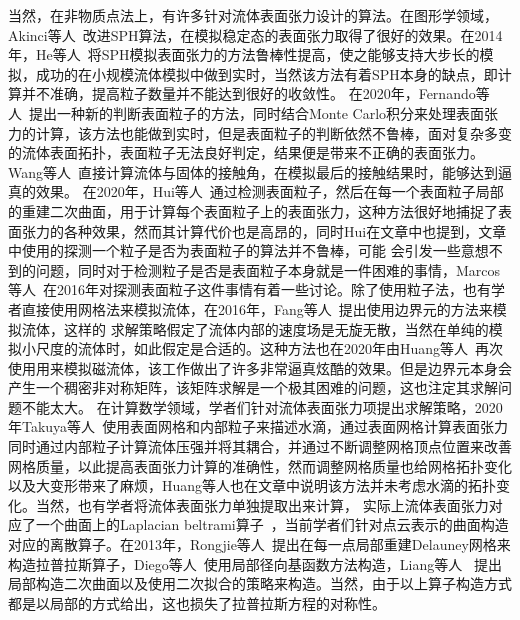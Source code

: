 当然，在非物质点法上，有许多针对流体表面张力设计的算法。在图形学领域，Akinci等人~\cite{akinci2013versatile}改进SPH算法，在模拟稳定态的表面张力取得了很好的效果。在2014年，He等人~\cite{He2014}将SPH模拟表面张力的方法鲁棒性提高，使之能够支持大步长的模拟，成功的在小规模流体模拟中做到实时，当然该方法有着SPH本身的缺点，即计算并不准确，提高粒子数量并不能达到很好的收敛性。
在2020年，Fernando等人~\cite{Zorrilla2020AcceleratingST}提出一种新的判断表面粒子的方法，同时结合Monte Carlo积分来处理表面张力的计算，该方法也能做到实时，但是表面粒子的判断依然不鲁棒，面对复杂多变的流体表面拓扑，表面粒子无法良好判定，结果便是带来不正确的表面张力。Wang等人~\cite{wang2005water}直接计算流体与固体的接触角，在模拟最后的接触结果时，能够达到逼真的效果。
在2020年，Hui等人~\cite{wang2020codimensional}通过检测表面粒子，然后在每一个表面粒子局部的重建二次曲面，用于计算每个表面粒子上的表面张力，这种方法很好地捕捉了表面张力的各种效果，然而其计算代价也是高昂的，同时Hui在文章中也提到，文章中使用的探测一个粒子是否为表面粒子的算法并不鲁棒，可能
会引发一些意想不到的问题，同时对于检测粒子是否是表面粒子本身就是一件困难的事情，Marcos等人~\cite{sandim2016boundary}在2016年对探测表面粒子这件事情有着一些讨论。除了使用粒子法，也有学者直接使用网格法来模拟流体，在2016年，Fang等人~\cite{da2016surface}提出使用边界元的方法来模拟流体，这样的
求解策略假定了流体内部的速度场是无旋无散，当然在单纯的模拟小尺度的流体时，如此假定是合适的。这种方法也在2020年由Huang等人~\cite{huang2020surface}再次使用用来模拟磁流体，该工作做出了许多非常逼真炫酷的效果。但是边界元本身会产生一个稠密非对称矩阵，该矩阵求解是一个极其困难的问题，这也注定其求解问题不能太大。
在计算数学领域，学者们针对流体表面张力项提出求解策略，2020年Takuya等人~\cite{matsunaga2020moving}使用表面网格和内部粒子来描述水滴，通过表面网格计算表面张力同时通过内部粒子计算流体压强并将其耦合，并通过不断调整网格顶点位置来改善网格质量，以此提高表面张力计算的准确性，然而调整网格质量也给网格拓扑变化以及大变形带来了麻烦，Huang等人也在文章中说明该方法并未考虑水滴的拓扑变化。当然，也有学者将流体表面张力单独提取出来计算，
实际上流体表面张力对应了一个曲面上的Laplacian beltrami算子~\cite{needham2021visual}，当前学者们针对点云表示的曲面构造对应的离散算子。在2013年，Rongjie等人~\cite{lai2013local}提出在每一点局部重建Delauney网格来构造拉普拉斯算子，Diego等人~\cite{alvarez2021local}使用局部径向基函数方法构造，Liang等人~\cite{liang2013solving}
提出局部构造二次曲面以及使用二次拟合的策略来构造。当然，由于以上算子构造方式都是以局部的方式给出，这也损失了拉普拉斯方程的对称性。
